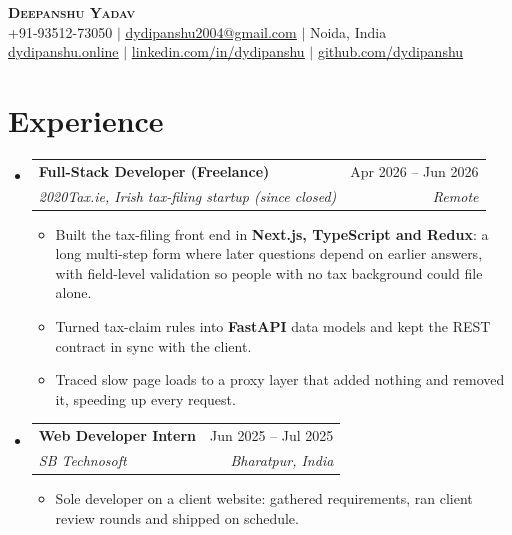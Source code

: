 \documentclass[a4paper,11pt]{article}
\makeatletter
\newcommand{\resumeItem}[1]{
  \item\small{
    {#1 \vspace{-2pt}}
  }
}
\newcommand{\resumeSubheading}[4]{
  \vspace{-2pt}\item
    \begin{tabular*}{0.97\textwidth}[t]{l@{\extracolsep{\fill}}r}
      \textbf{#1} & #2 \\
      \textit{\small#3} & \textit{\small #4} \\
    \end{tabular*}\vspace{-7pt}
}
\newcommand{\resumeSubHeadingListStart}{\begin{itemize}[leftmargin=0.15in, label={}]}
\newcommand{\resumeSubHeadingListEnd}{\end{itemize}}
\newcommand{\resumeItemListStart}{\begin{itemize}}
\newcommand{\resumeItemListEnd}{\end{itemize}\vspace{-5pt}}
\makeatother
\begin{document}
\begin{center}
    \textbf{\Huge \scshape Deepanshu Yadav} \\ \vspace{1pt}
    \small +91-93512-73050 $|$ \href{mailto:dydipanshu2004@gmail.com}{\underline{dydipanshu2004@gmail.com}} $|$ Noida, India \\
    \href{https://dydipanshu.online}{\underline{dydipanshu.online}} $|$
    \href{https://linkedin.com/in/dydipanshu}{\underline{linkedin.com/in/dydipanshu}} $|$
    \href{https://github.com/dydipanshu}{\underline{github.com/dydipanshu}}
\end{center}

\section{Experience}
  \resumeSubHeadingListStart
    \resumeSubheading
      {Full-Stack Developer (Freelance)}{Apr 2026 -- Jun 2026}
      {2020Tax.ie, Irish tax-filing startup (since closed)}{Remote}
      \resumeItemListStart
        \resumeItem{Built the tax-filing front end in \textbf{Next.js, TypeScript and Redux}: a long multi-step form where later questions depend on earlier answers, with field-level validation so people with no tax background could file alone.}
        \resumeItem{Turned tax-claim rules into \textbf{FastAPI} data models and kept the REST contract in sync with the client.}
        \resumeItem{Traced slow page loads to a proxy layer that added nothing and removed it, speeding up every request.}
      \resumeItemListEnd
    \resumeSubheading
      {Web Developer Intern}{Jun 2025 -- Jul 2025}
      {SB Technosoft}{Bharatpur, India}
      \resumeItemListStart
        \resumeItem{Sole developer on a client website: gathered requirements, ran client review rounds and shipped on schedule.}
      \resumeItemListEnd
  \resumeSubHeadingListEnd
\end{document}

